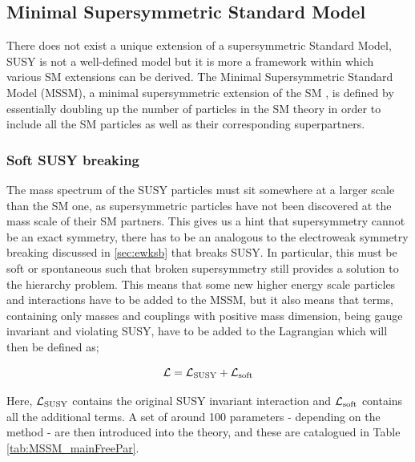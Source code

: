 		\subsection{Minimal Supersymmetric Standard Model}
			
			There does not exist a unique extension of a supersymmetric Standard Model, \ie SUSY is not a well-defined model but it is more a framework within which various SM extensions can be derived.
			The Minimal Supersymmetric Standard Model (MSSM), a minimal supersymmetric extension of the SM \cite{Jegerlehner:2013nna}, is defined by essentially doubling up the number of particles in the SM theory in order to include all the SM particles as well as their corresponding superpartners.

			\subsubsection*{Soft SUSY breaking}
				The mass spectrum of the SUSY particles must sit somewhere at a larger scale than the SM one, as supersymmetric particles have not been discovered at the mass scale of their SM partners. This gives us a hint that supersymmetry cannot be an exact symmetry, there has to be an analogous to the electroweak symmetry breaking discussed in \ref{sec:ewksb} that breaks SUSY. In particular, this must be soft or spontaneous such that broken supersymmetry still provides a solution to the hierarchy problem. This means that some new higher energy scale particles and interactions have to be added to the MSSM, but it also means that terms, containing only masses and couplings with positive mass dimension, being gauge invariant and violating SUSY, have to be added to the Lagrangian which will then be defined as;

				\begin{equation}
				\label{eq:soft_sb}
					\cal L = \cal {L_{\mathrm{SUSY}}} + \cal {L_{\mathrm{soft}}}
				\end{equation}

				\noindent Here, $\cal {L_{\mathrm{SUSY}}}$ contains the original SUSY invariant interaction and $\cal {L_{\mathrm{soft}}}$ contains all the additional terms. A set of around 100 parameters - depending on the method - are then introduced into the theory, and these are catalogued in Table \ref{tab:MSSM_mainFreePar}. 

